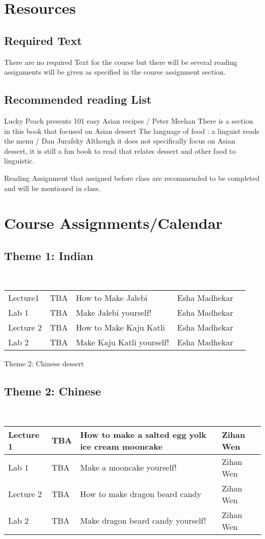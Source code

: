 \documentclass{article}
\begin{document}
\section{Resources}
\subsection{Required Text}
There are no required Text for the course but there will be several reading assignments will be given as specified in the course assignment section. 

\subsection{Recommended reading List}
Lucky Peach presents 101 easy Asian recipes / Peter Meehan 
There is a section in this book that focused on Asian dessert
The language of food : a linguist reads the menu / Dan Jurafsky
Although it does not specifically focus on Asian dessert, it is still a fun book to read that relates dessert and other food to linguistic.

Reading Assignment that assigned before class are recommended to be completed and will be mentioned in class.


\section{Course Assignments/Calendar}

\subsection*{Theme 1: Indian }\\


\begin{table}[h]
\begin{tabular}{lllll}
 Lecture1 &  TBA & How to Make Jalebi & Esha Madhekar  \\
 Lab 1 &  TBA & Make Jalebi yourself! & Esha Madhekar  \\
 Lecture 2 &  TBA & How to Make Kaju Katli & Esha Madhekar  \\
 Lab 2 & TBA & Make Kaju Katli yourself! & Esha Madhekar 
\end{tabular}
\end{table}

Theme 2: Chinese dessert
 \subsection*{Theme 2: Chinese }\\
 \vspace{0.5em} \begin{tabular}{|l|l|l|l|}
\hline 
Lecture 1 & TBA & How to make a salted egg yolk ice cream mooncake & Zihan Wen\\
\hline
Lab 1 & TBA & Make a mooncake yourself!& Zihan Wen\\
\hline
Lecture 2 & TBA & How to make dragon beard candy & Zihan Wen\\
\hline 
Lab 2 & TBA & Make dragon beard candy yourself!& Zihan Wen\\
\hline
\end{tabular}
\end{document}
